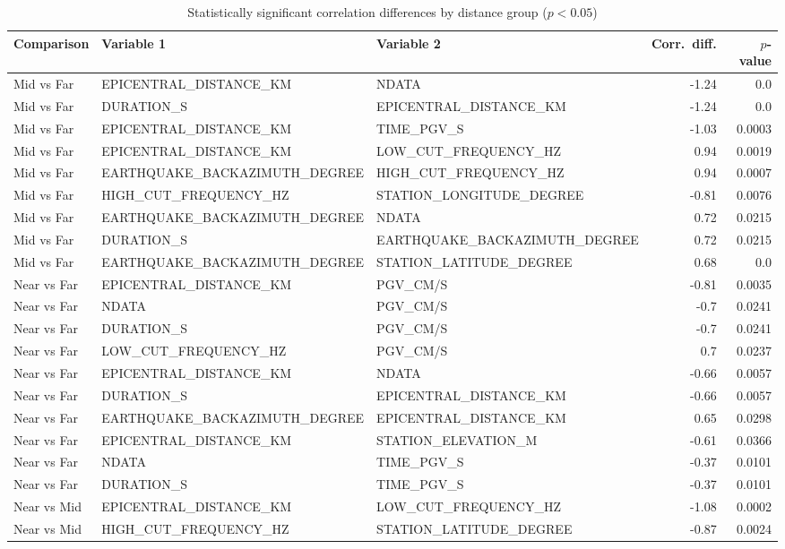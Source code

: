 \begin{table}[H]
\centering
\caption{Statistically significant correlation differences by distance group ($p < 0.05$)}
\label{tab:corr_diff}
\begin{tabular}{lllrr}
\toprule
Comparison & Variable 1 & Variable 2 & Corr.\ diff. & $p$-value \\
\midrule
Mid vs Far & EPICENTRAL_DISTANCE_KM & NDATA & -1.24 & 0.0 \\
Mid vs Far & DURATION_S & EPICENTRAL_DISTANCE_KM & -1.24 & 0.0 \\
Mid vs Far & EPICENTRAL_DISTANCE_KM & TIME_PGV_S & -1.03 & 0.0003 \\
Mid vs Far & EPICENTRAL_DISTANCE_KM & LOW_CUT_FREQUENCY_HZ & 0.94 & 0.0019 \\
Mid vs Far & EARTHQUAKE_BACKAZIMUTH_DEGREE & HIGH_CUT_FREQUENCY_HZ & 0.94 & 0.0007 \\
Mid vs Far & HIGH_CUT_FREQUENCY_HZ & STATION_LONGITUDE_DEGREE & -0.81 & 0.0076 \\
Mid vs Far & EARTHQUAKE_BACKAZIMUTH_DEGREE & NDATA & 0.72 & 0.0215 \\
Mid vs Far & DURATION_S & EARTHQUAKE_BACKAZIMUTH_DEGREE & 0.72 & 0.0215 \\
Mid vs Far & EARTHQUAKE_BACKAZIMUTH_DEGREE & STATION_LATITUDE_DEGREE & 0.68 & 0.0 \\
Near vs Far & EPICENTRAL_DISTANCE_KM & PGV_CM/S & -0.81 & 0.0035 \\
Near vs Far & NDATA & PGV_CM/S & -0.7 & 0.0241 \\
Near vs Far & DURATION_S & PGV_CM/S & -0.7 & 0.0241 \\
Near vs Far & LOW_CUT_FREQUENCY_HZ & PGV_CM/S & 0.7 & 0.0237 \\
Near vs Far & EPICENTRAL_DISTANCE_KM & NDATA & -0.66 & 0.0057 \\
Near vs Far & DURATION_S & EPICENTRAL_DISTANCE_KM & -0.66 & 0.0057 \\
Near vs Far & EARTHQUAKE_BACKAZIMUTH_DEGREE & EPICENTRAL_DISTANCE_KM & 0.65 & 0.0298 \\
Near vs Far & EPICENTRAL_DISTANCE_KM & STATION_ELEVATION_M & -0.61 & 0.0366 \\
Near vs Far & NDATA & TIME_PGV_S & -0.37 & 0.0101 \\
Near vs Far & DURATION_S & TIME_PGV_S & -0.37 & 0.0101 \\
Near vs Mid & EPICENTRAL_DISTANCE_KM & LOW_CUT_FREQUENCY_HZ & -1.08 & 0.0002 \\
Near vs Mid & HIGH_CUT_FREQUENCY_HZ & STATION_LATITUDE_DEGREE & -0.87 & 0.0024 \\

\end{tabular}
\end{table}
